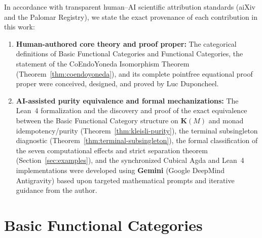 \documentclass[11pt,a4paper]{article}
\theoremstyle{definition}
\theoremstyle{remark}
\newcommand{\K}{\mathbf{K}}
\begin{document}
In accordance with transparent human--AI scientific attribution standards (aiXiv and the Palomar
Registry), we state the exact provenance of each contribution in this work:
\begin{enumerate}[label=(\arabic*),nosep]
  \item \textbf{Human-authored core theory and proof proper:} The categorical definitions of Basic
  Functional Categories and Functional Categories, the statement of the CoEndoYoneda Isomorphism
  Theorem (Theorem~\ref{thm:coendoyoneda}), and its complete pointfree equational proof proper were
  conceived, designed, and proved by Luc Duponcheel.
\vspace{4pt}
  \item \textbf{AI-assisted purity equivalence and formal mechanizations:} The Lean~4 formalization
  and the discovery and proof of the exact equivalence between the Basic Functional Category structure
  on $\K(M)$ and monad idempotency/purity (Theorem~\ref{thm:kleisli-purity}), the
  terminal subsingleton diagnostic (Theorem~\ref{thm:terminal-subsingleton}), the formal classification
  of the seven computational effects and strict separation theorem (Section~\ref{sec:examples}), and the
  synchronized Cubical Agda and Lean~4 implementations were developed using \textbf{Gemini} (Google
  DeepMind Antigravity) based upon targeted mathematical prompts and iterative guidance from the author.
\end{enumerate}

\section{Basic Functional Categories}\label{sec:bfc}
\end{document}
